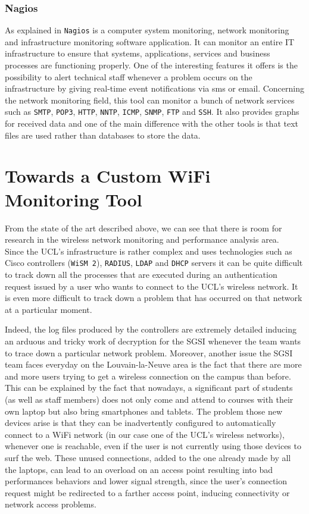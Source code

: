 \subsubsection{Nagios}
As explained in \cite{nagios} \texttt{Nagios} is a computer system monitoring, network monitoring and infrastructure monitoring software application. It can monitor an entire IT infrastructure to ensure that systems, applications, services and business processes are functioning properly. One of the interesting features it offers is the possibility to alert technical staff whenever a problem occurs on the infrastructure by giving real-time event notifications via sms or email. Concerning the network monitoring field, this tool can monitor a bunch of network services such as \texttt{SMTP}, \texttt{POP3}, \texttt{HTTP}, \texttt{NNTP}, \texttt{ICMP}, \texttt{SNMP}, \texttt{FTP} and \texttt{SSH}. It also provides graphs for received data and one of the main difference with the other tools is that text files are used rather than databases to store the data.


\section{Towards a Custom WiFi Monitoring Tool}
From the state of the art described above, we can see that there is room for research in the wireless network monitoring and performance analysis area.\\
Since the UCL's infrastructure is rather complex and uses technologies such as Cisco controllers (\texttt{WiSM 2}), \texttt{RADIUS}, \texttt{LDAP} and \texttt{DHCP} servers it can be quite difficult to track down all the processes that are executed during an authentication request issued by a user who wants to connect to the UCL's wireless network. It is even more difficult to track down a problem that has occurred on that network at a particular moment.

Indeed, the log files produced by the controllers are extremely detailed inducing an arduous and tricky work of decryption for the SGSI whenever the team wants to trace down a particular network problem. Moreover, another issue the SGSI team faces everyday on the Louvain-la-Neuve area is the fact that there are more and more users trying to get a wireless connection on the campus than before. This can be explained by the fact that nowadays, a significant part of students (as well as staff members) does not only come and attend to courses with their own laptop but also bring smartphones and tablets. The problem those new devices arise is that they can be inadvertently configured to automatically connect to a WiFi network (in our case one of the UCL's wireless networks), whenever one is reachable, even if the user is not currently using those devices to surf the web. These unused connections, added to the one already made by all the laptops, can lead to an overload on an access point resulting into bad performances behaviors and lower signal strength, since the user's connection request might be redirected to a farther access point, inducing connectivity or network access problems.


